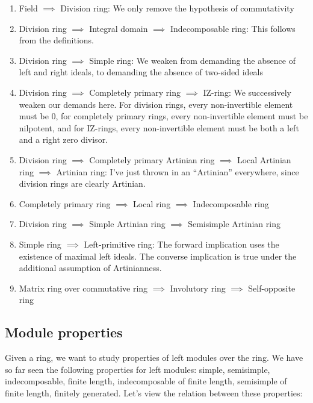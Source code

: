 \documentclass[a4paper]{amsart}
\begin{document}
\begin{enumerate}

\item Field $\implies$ Division ring: We only remove the hypothesis of
  commutativity

\item Division ring $\implies$ Integral domain $\implies$
  Indecomposable ring: This follows from the definitions.
\item Division ring $\implies$ Simple ring: We weaken from demanding
  the absence of left and right ideals, to demanding the absence of
  two-sided ideals

\item Division ring $\implies$ Completely primary ring $\implies$
  IZ-ring: We successively weaken our demands here. For division
  rings, every non-invertible element must be $0$, for completely
  primary rings, every non-invertible element must be nilpotent, and
  for IZ-rings, every non-invertible element must be both a left and a
  right zero divisor.

\item Division ring $\implies$ Completely primary Artinian ring
  $\implies$ Local Artinian ring $\implies$ Artinian ring: I've just
  thrown in an ``Artinian'' everywhere, since division rings are
  clearly Artinian.

\item Completely primary ring $\implies$ Local ring $\implies$
  Indecomposable ring

\item Division ring $\implies$ Simple Artinian ring $\implies$
  Semisimple Artinian ring

\item Simple ring $\implies$ Left-primitive ring: The forward
  implication uses the existence of maximal left ideals. The converse
  implication is true under the additional assumption of Artinianness.

\item Matrix ring over commutative ring $\implies$ Involutory ring
  $\implies$ Self-opposite ring

\end{enumerate}

\subsection{Module properties}

Given a ring, we want to study properties of left modules over the
ring.  We have so far seen the following properties for left modules:
simple, semisimple, indecomposable, finite length, indecomposable of
finite length, semisimple of finite length, finitely generated. Let's
view the relation between these properties:
\end{document}
